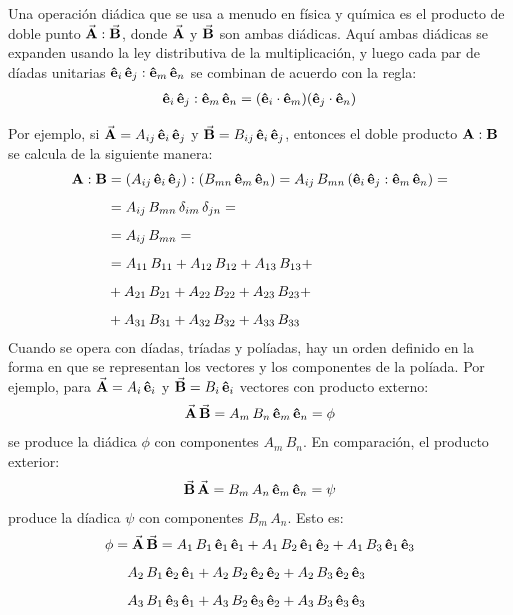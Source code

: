 \documentclass[hidelinks,12pt]{article}
\begin{document}
Una operación diádica que se usa a menudo en física y química es el producto de doble punto $\va{A} : \va{B}$, donde $\va{A}$ y $\va{B}$ son ambas diádicas. Aquí ambas diádicas se expanden usando la ley distributiva de la multiplicación, y luego cada par de díadas unitarias $\vu{e}_{i} \, \vu{e}_{j} : \vu{e}_{m} \, \vu{e}_{n}$ se combinan de acuerdo con la regla:
\begin{align*}
\vu{e}_{i} \, \vu{e}_{j} : \vu{e}_{m} \, \vu{e}_{n} = (\vu{e}_{i} \cdot \vu{e}_{m}) (\vu{e}_{j} \cdot \vu{e}_{n})
\end{align*}

Por ejemplo, si $\va{A} = A_{ij} \, \vu{e}_{i} \, \vu{e}_{j}$ y $\va{B} = B_{ij} \, \vu{e}_{i} \, \vu{e}_{j}$, entonces el doble producto $\vb{A} : \vb{B}$ se calcula de la siguiente manera:
\begin{align*}
\vb{A} : \vb{B} &= \left( A_{ij} \, \vu{e}_{i} \, \vu{e}_{j} \right) : \left( B_{mn} \, \vu{e}_{m} \, \vu{e}_{n} \right) = A_{ij} \, B_{mn} \left( \vu{e}_{i} \, \vu{e}_{j} : \vu{e}_{m} \, \vu{e}_{n} \right) = \\[0.5em]
&= A_{ij} \, B_{mn} \, \delta_{im} \, \delta_{jn} = \\[0.5em]
&= A_{ij} \, B_{mn} = \\[0.5em]
&= A_{11} \, B_{11} + A_{12} \, B_{12} + A_{13} \, B_{13} + \\[0.5em] 
&+ A_{21} \, B_{21} + A_{22} \, B_{22} + A_{23} \, B_{23} + \\[0.5em] 
&+ A_{31} \, B_{31} + A_{32} \, B_{32} + A_{33} \, B_{33} 
\end{align*}
Cuando se opera con díadas, tríadas y políadas, hay un orden definido en la forma en que se representan los vectores y los componentes de la políada. Por ejemplo, para $\va{A} = A_{i} \, \vu{e}_{i}$ y $\va{B} = B_{i} \, \vu{e}_{i}$ vectores con producto externo:
\begin{align*}
\va{A} \, \va{B} = A_{m} \, B_{n} \, \vu{e}_{m} \, \vu{e}_{n} = \phi
\end{align*}
se produce la diádica $\phi$ con componentes $A_{m} \, B_{n}$. En comparación, el producto exterior:
\begin{align*}
\va{B} \, \va{A} = B_{m} \, A_{n} \, \vu{e}_{m} \, \vu{e}_{n} = \psi
\end{align*}
produce la díadica $\psi$ con componentes $B_{m} \, A_{n}$. Esto es:
\begin{align*}
\phi &= \va{A} \, \va{B} =  A_{1} \, B_{1} \, \vu{e}_{1} \, \vu{e}_{1} + A_{1} \, B_{2} \, \vu{e}_{1} \, \vu{e}_{2} + A_{1} \, B_{3} \, \vu{e}_{1} \, \vu{e}_{3} \\[0.5em]
&{\quad} A_{2} \, B_{1} \, \vu{e}_{2} \, \vu{e}_{1} + A_{2} \, B_{2} \, \vu{e}_{2} \, \vu{e}_{2} + A_{2} \, B_{3} \, \vu{e}_{2} \, \vu{e}_{3} \\[0.5em]
&{\quad} A_{3} \, B_{1} \, \vu{e}_{3} \, \vu{e}_{1} + A_{3} \, B_{2} \, \vu{e}_{3} \, \vu{e}_{2} + A_{3} \, B_{3} \, \vu{e}_{3} \, \vu{e}_{3}
\end{align*}
\end{document}
